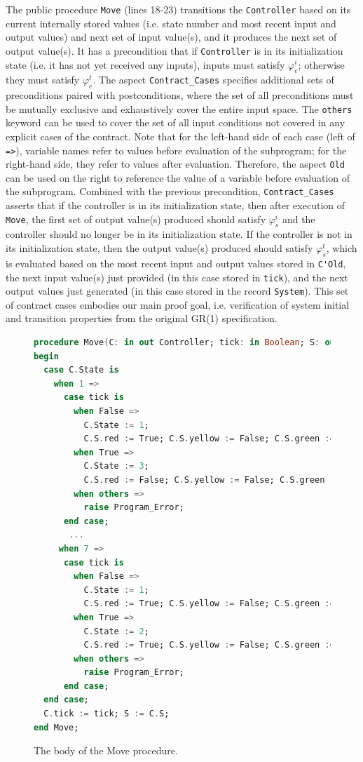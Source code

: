 \documentclass[runningheads]{llncs}
\begin{document}
The public procedure \lstinline{Move} (lines 18-23) transitions the \lstinline{Controller} based on 
its current internally stored values (i.e. state number and most recent input and output values) and 
next set of input value(s), and it produces the next set of output value(s). 
It has a precondition that if \lstinline{Controller} is in its initialization state (i.e. it has not yet received any inputs), 
inputs must satisfy $\varphi_e^i$; otherwise they must satisfy $\varphi_e^t$.
The aspect \lstinline{Contract_Cases} specifies additional sets of preconditions paired with postconditions, 
where the set of all preconditions must be mutually exclusive and exhaustively cover the entire input space.
The \lstinline{others} keyword can be used to cover the set of all input conditions not covered in any explicit cases of the contract. 
Note that for the left-hand side of each case (left of \lstinline{=>}), variable names refer to values before evaluation of the subprogram; 
for the right-hand side, they refer to values after evaluation.
Therefore, the aspect \lstinline{Old} can be used on the right to reference the value of a variable before evaluation of the subprogram. 
Combined with the previous precondition, \lstinline{Contract_Cases} asserts that if the controller is in its initialization state, then after execution of \lstinline{Move}, 
the first set of output value(s) produced should satisfy $\varphi_s^i$ and the controller should no longer be in its initialization state.  
If the controller is not in its initialization state, then the output value(s) produced should satisfy $\varphi_s^t$, which is
evaluated based on the most recent input and output values stored in \lstinline{C'Old}, the next input value(s) just provided (in this case stored in \lstinline{tick}), 
and the next output values just generated (in this case stored in the record \lstinline{System}). 
This set of contract cases embodies our main proof goal, i.e. verification of system initial and transition properties from the original GR(1) specification. 

\begin{figure}
\begin{lstlisting}[language={Ada}, basicstyle=\scriptsize]  
procedure Move(C: in out Controller; tick: in Boolean; S: out System) is
begin
  case C.State is
    when 1 =>
      case tick is
        when False =>
          C.State := 1; 
          C.S.red := True; C.S.yellow := False; C.S.green := False;
        when True =>
          C.State := 3; 
          C.S.red := False; C.S.yellow := False; C.S.green := True;
        when others =>
          raise Program_Error;
      end case;
       ...      
     when 7 =>
      case tick is
        when False =>
          C.State := 1; 
          C.S.red := True; C.S.yellow := False; C.S.green := False;
        when True => 
          C.State := 2; 
          C.S.red := True; C.S.yellow := False; C.S.green := False;
        when others =>
          raise Program_Error;
      end case;
  end case;
  C.tick := tick; S := C.S;
end Move;
\end{lstlisting}
  \caption{The body of the Move procedure.}
  \label{fig:moveBody}
\end{figure}
\end{document}
